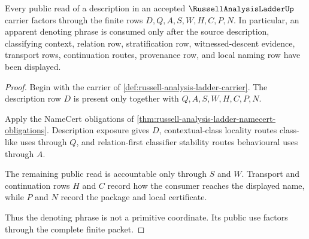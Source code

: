 \begin{theorem}
\label{thm:russell-analysis-ladder-description-factorization}
Every public read of a description in an accepted $\RussellAnalysisLadderUp$ carrier factors through the finite rows $D,Q,A,S,W,H,C,P,N$. In particular, an apparent denoting phrase is consumed only after the source description, classifying context, relation row, stratification row, witnessed-descent evidence, transport rows, continuation routes, provenance row, and local naming row have been displayed.
\end{theorem}
\begin{proof}
Begin with the carrier of \autoref{def:russell-analysis-ladder-carrier}. The description row $D$ is present only together with $Q,A,S,W,H,C,P,N$.

Apply the NameCert obligations of \autoref{thm:russell-analysis-ladder-namecert-obligations}. Description exposure gives $D$, contextual-class locality routes class-like uses through $Q$, and relation-first classifier stability routes behavioural uses through $A$.

The remaining public read is accountable only through $S$ and $W$. Transport and continuation rows $H$ and $C$ record how the consumer reaches the displayed name, while $P$ and $N$ record the package and local certificate.

Thus the denoting phrase is not a primitive coordinate. Its public use factors through the complete finite packet.
\end{proof}


